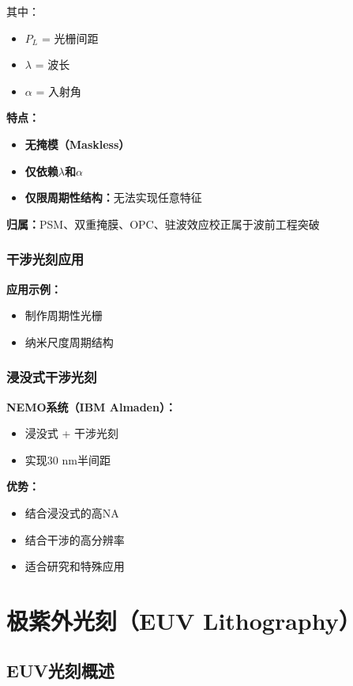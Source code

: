 \documentclass[UTF8,12pt,a4paper]{ctexart}
\begin{document}
其中：
\begin{itemize}
    \item $P_L$ = 光栅间距
    \item $\lambda$ = 波长
    \item $\alpha$ = 入射角
\end{itemize}

\textbf{特点：}
\begin{itemize}
    \item \textbf{无掩模（Maskless）}
    \item \textbf{仅依赖$\lambda$和$\alpha$}
    \item \textbf{仅限周期性结构：}无法实现任意特征
\end{itemize}

\textbf{归属：}PSM、双重掩膜、OPC、驻波效应校正属于波前工程突破

\subsubsection{干涉光刻应用}

\textbf{应用示例：}
\begin{itemize}
    \item 制作周期性光栅
    \item 纳米尺度周期结构
\end{itemize}

\subsubsection{浸没式干涉光刻}

\textbf{NEMO系统（IBM Almaden）：}
\begin{itemize}
    \item 浸没式 + 干涉光刻
    \item 实现30 nm半间距
\end{itemize}

\textbf{优势：}
\begin{itemize}
    \item 结合浸没式的高NA
    \item 结合干涉的高分辨率
    \item 适合研究和特殊应用
\end{itemize}

\section{极紫外光刻（EUV Lithography）}

\subsection{EUV光刻概述}
\end{document}
